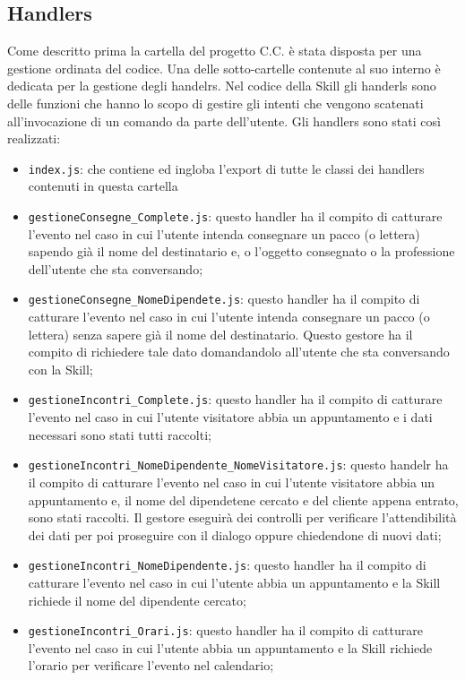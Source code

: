 \subsection{Handlers}
Come descritto prima la cartella del progetto C.C. è stata disposta per una gestione ordinata del codice. Una delle sotto-cartelle contenute al suo interno è dedicata per la gestione degli handelrs. Nel codice della Skill gli handerls sono delle funzioni che hanno lo scopo di gestire gli intenti che vengono scatenati all'invocazione di un comando da parte dell'utente. Gli handlers sono stati così realizzati:
\begin{itemize}
    \item \texttt{index.js}: che contiene ed ingloba l'export di tutte le classi dei handlers contenuti in questa cartella
    
    \item \texttt{gestioneConsegne\_Complete.js}: questo handler ha il compito di catturare l'evento nel caso in cui l'utente intenda consegnare un pacco (o lettera) sapendo già il nome del destinatario e, o l'oggetto consegnato o la professione dell'utente che sta conversando;
    \item \texttt{gestioneConsegne\_NomeDipendete.js}: questo handler ha il compito di catturare l'evento nel caso in cui l'utente intenda consegnare un pacco (o lettera) senza sapere già il nome del destinatario. Questo gestore ha il compito di richiedere tale dato domandandolo all'utente che sta conversando con la Skill;
    \item \texttt{gestioneIncontri\_Complete.js}: questo handler ha il compito di catturare l'evento nel caso in cui l'utente visitatore abbia un appuntamento e i dati necessari sono stati tutti raccolti;
    \item \texttt{gestioneIncontri\_NomeDipendente\_NomeVisitatore.js}: questo handelr ha il compito di catturare l'evento nel caso in cui l'utente visitatore abbia un appuntamento e, il nome del dipendetene cercato e del cliente appena entrato, sono stati raccolti. Il gestore eseguirà dei controlli per verificare l'attendibilità dei dati per poi proseguire con il dialogo oppure chiedendone di nuovi dati;
    \item \texttt{gestioneIncontri\_NomeDipendente.js}: questo handler ha il compito di catturare l'evento nel caso in cui l'utente abbia un appuntamento e la Skill richiede il nome del dipendente cercato;
    \item \texttt{gestioneIncontri\_Orari.js}: questo handler ha il compito di catturare l'evento nel caso in cui l'utente abbia un appuntamento e la Skill richiede l'orario per verificare l'evento nel calendario;

\end{itemize}
